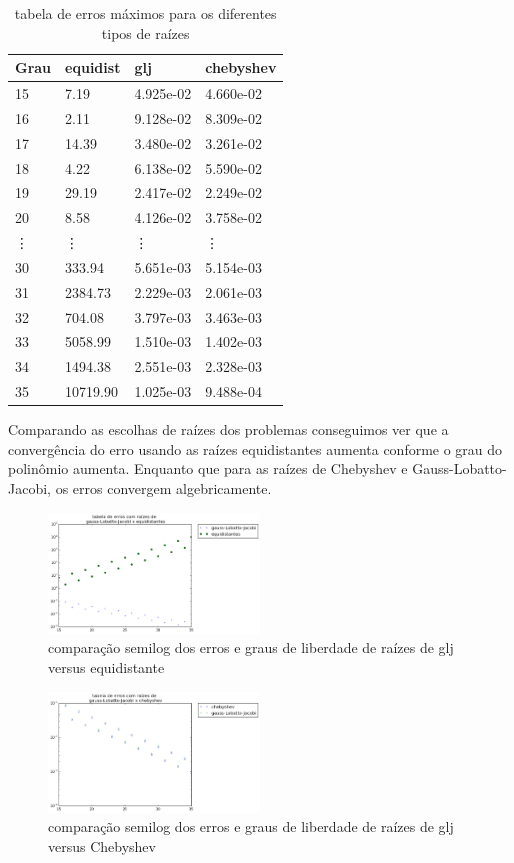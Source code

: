 \pagebreak
\begin{table}[h]
\centering
\caption{tabela de erros máximos para os diferentes tipos de raízes}
\label{my-label}
\begin{tabular}{|l|l|l|l|}
\hline
Grau & equidist & glj       & chebyshev     \\ \hline
15   & 7.19     & 4.925e-02 & 4.660e-02 \\
16   & 2.11     & 9.128e-02 & 8.309e-02 \\
17   & 14.39    & 3.480e-02 & 3.261e-02 \\
18   & 4.22     & 6.138e-02 & 5.590e-02 \\
19   & 29.19    & 2.417e-02 & 2.249e-02 \\
20   & 8.58     & 4.126e-02 & 3.758e-02 \\
\vdots   & \vdots              & \vdots    & \vdots    \\
30   & 333.94   & 5.651e-03 & 5.154e-03 \\
31   & 2384.73  & 2.229e-03 & 2.061e-03 \\
32   & 704.08   & 3.797e-03 & 3.463e-03 \\
33   & 5058.99  & 1.510e-03 & 1.402e-03 \\
34   & 1494.38  & 2.551e-03 & 2.328e-03 \\
35   & 10719.90 & 1.025e-03 & 9.488e-04 \\ \hline
\end{tabular}
\end{table}
Comparando as escolhas de raízes dos problemas conseguimos ver que a convergência do erro usando as raízes equidistantes aumenta conforme o grau do polinômio aumenta. Enquanto que para as raízes de Chebyshev e Gauss-Lobatto-Jacobi, os erros convergem algebricamente. 
\begin{figure}[!ht]
  \includegraphics[width=0.5\textwidth,center]{figuras/glj_equi.png}
  \caption{comparação semilog  dos erros e graus de liberdade de raízes de glj versus equidistante }
\end{figure}
\begin{figure}[!hb]
  \includegraphics[width=0.5\textwidth,center]{figuras/glj_cheb.png}
  \caption{comparação semilog  dos erros e graus de liberdade de raízes de glj versus Chebyshev}
\end{figure}
